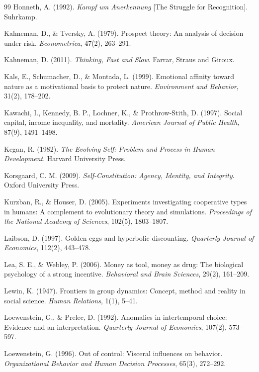 \begin{thebibliography}{99}
Honneth, A. (1992).
\textit{Kampf um Anerkennung} [The Struggle for Recognition].
Suhrkamp.

Kahneman, D., \& Tversky, A. (1979).
Prospect theory: An analysis of decision under risk.
\textit{Econometrica}, 47(2), 263--291.

Kahneman, D. (2011).
\textit{Thinking, Fast and Slow}.
Farrar, Straus and Giroux.

Kals, E., Schumacher, D., \& Montada, L. (1999).
Emotional affinity toward nature as a motivational basis to protect nature.
\textit{Environment and Behavior}, 31(2), 178--202.

Kawachi, I., Kennedy, B. P., Lochner, K., \& Prothrow-Stith, D. (1997).
Social capital, income inequality, and mortality.
\textit{American Journal of Public Health}, 87(9), 1491--1498.

Kegan, R. (1982).
\textit{The Evolving Self: Problem and Process in Human Development}.
Harvard University Press.

Korsgaard, C. M. (2009).
\textit{Self-Constitution: Agency, Identity, and Integrity}.
Oxford University Press.

Kurzban, R., \& Houser, D. (2005).
Experiments investigating cooperative types in humans: A complement to evolutionary theory and simulations.
\textit{Proceedings of the National Academy of Sciences}, 102(5), 1803--1807.

Laibson, D. (1997).
Golden eggs and hyperbolic discounting.
\textit{Quarterly Journal of Economics}, 112(2), 443--478.

Lea, S. E., \& Webley, P. (2006).
Money as tool, money as drug: The biological psychology of a strong incentive.
\textit{Behavioral and Brain Sciences}, 29(2), 161--209.

Lewin, K. (1947).
Frontiers in group dynamics: Concept, method and reality in social science.
\textit{Human Relations}, 1(1), 5--41.

Loewenstein, G., \& Prelec, D. (1992).
Anomalies in intertemporal choice: Evidence and an interpretation.
\textit{Quarterly Journal of Economics}, 107(2), 573--597.

Loewenstein, G. (1996).
Out of control: Visceral influences on behavior.
\textit{Organizational Behavior and Human Decision Processes}, 65(3), 272--292.


\end{thebibliography}
